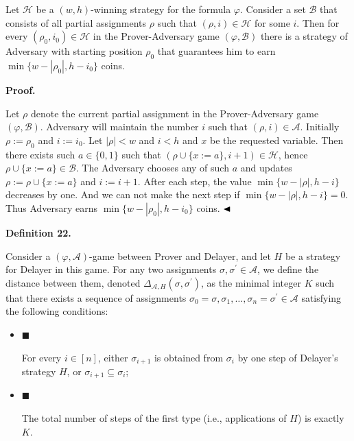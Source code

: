 Let $\mathcal{H}$ be a $(w,h)$-winning strategy for the formula $\varphi$.
Consider a set $\mathcal{B}$ that consists of all partial assignments $\rho$ such that $(\rho,i)\in\mathcal{H}$ for some $i$.
Then for every $(\rho_{0},i_{0})\in\mathcal{H}$ in the Prover-Adversary game $(\varphi,\mathcal{B})$ there is a strategy of Adversary with starting position $\rho_{0}$ that guarantees him to earn $\min\{w-|\rho_{0}|,h-i_{0}\}$ coins.\par



\par\medskip\noindent\textbf{Proof.}\par


Let $\rho$ denote the current partial assignment in the Prover-Adversary game
$(\varphi,\mathcal{B})$.
Adversary will maintain the number $i$ such that $(\rho,i)\in\mathcal{A}$.
Initially $\rho:=\rho_{0}$ and $i:=i_{0}$.
Let $|\rho|<w$ and $i<h$ and $x$ be the requested variable.
Then there exists such $a\in\{0,1\}$ such that $(\rho\cup\{x:=a\},i+1)\in\mathcal{H}$,
hence $\rho\cup\{x:=a\}\in\mathcal{B}$.
The Adversary chooses any of such $a$ and updates $\rho:=\rho\cup\{x:=a\}$ and $i:=i+1$.
After each step, the value $\min\{w-|\rho|,h-i\}$ decreases by one.
And we can not make the next step if $\min\{w-|\rho|,h-i\}=0$.
Thus Adversary earns $\min\{w-|\rho_{0}|,h-i_{0}\}$ coins.
$\hfill\blacktriangleleft$\par



\par\medskip\noindent\textbf{
Definition 22.
}\par



Consider a $(\varphi,\mathcal{A})$-game between Prover and Delayer, and let $H$ be a strategy for Delayer in this game.
For any two assignments $\sigma,\sigma^{\prime}\in\mathcal{A}$, we define the distance between them, denoted $\Delta_{\mathcal{A},H}(\sigma,\sigma^{\prime})$, as the minimal integer $K$ such that there exists a sequence of assignments $\sigma_{0}=\sigma,\sigma_{1},\dots,\sigma_{n}=\sigma^{\prime}\in\mathcal{A}$ satisfying the following conditions:\par


\begin{itemize}


\item 
$\blacksquare$ 


For every $i\in[n]$, either $\sigma_{i+1}$ is obtained from $\sigma_{i}$ by one step of Delayer’s strategy $H$, or $\sigma_{i+1}\subseteq\sigma_{i}$;\par





\item 
$\blacksquare$ 


The total number of steps of the first type (i.e., applications of $H$) is exactly $K$.\par





\end{itemize}


